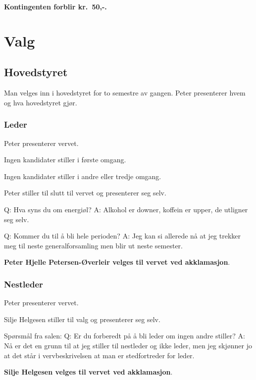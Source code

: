 \documentclass[10pt,norsk,a4paper,usenames,dvipsnames]{article}
\begin{document}
\textbf{Kontingenten forblir kr.~50,-.}

\section{Valg}

\begin{multicols}{2}

    \subsection{Hovedstyret}
        Man velges inn i hovedstyret for to semestre av gangen.
    Peter presenterer hvem og hva hovedstyret gjør.
        \subsubsection{Leder}
        Peter presenterer vervet.

        Ingen kandidater stiller i første omgang.

        Ingen kandidater stiller i andre eller tredje omgang.


        Peter stiller til slutt til vervet og presenterer seg selv.


        Q: Hva syns du om energiøl?
        A: Alkohol er downer, koffein er upper, de utligner seg selv.

        Q: Kommer du til å bli hele perioden?
        A: Jeg kan si allerede nå at jeg trekker meg til neste generalforsamling men blir ut neste semester.


        \textbf{Peter Hjelle Petersen-Øverleir velges til vervet ved akklamasjon}.

        \subsubsection{Nestleder}
        Peter presenterer vervet.

        Silje Helgesen stiller til valg og presenterer seg selv.

        Spørsmål fra salen:
        Q: Er du forberedt på å bli leder om ingen andre stiller?
        A: Nå er det en grunn til at jeg stiller til nestleder og ikke leder, men jeg skjønner jo at det står i vervbeskrivelsen at man er stedfortreder for leder.

        \textbf{Silje Helgesen velges til vervet ved akklamasjon}.




\end{multicols}
\end{document}
